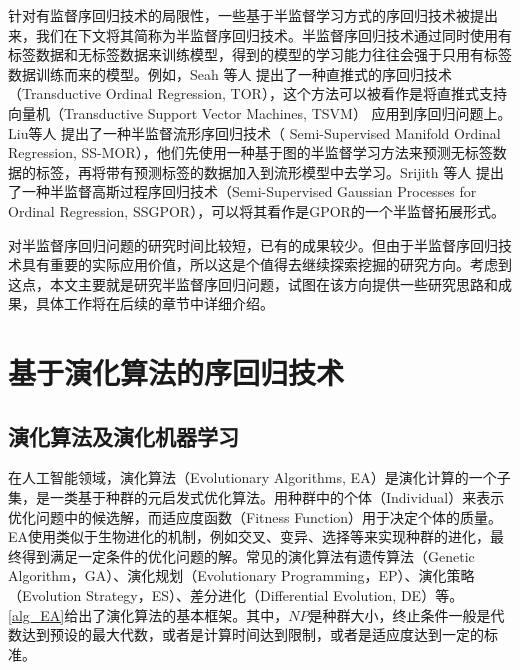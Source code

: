 针对有监督序回归技术的局限性，一些基于半监督学习方式的序回归技术被提出来，我们在下文将其简称为半监督序回归技术。半监督序回归技术通过同时使用有标签数据和无标签数据来训练模型，得到的模型的学习能力往往会强于只用有标签数据训练而来的模型。例如，Seah 等人\citep{seah2012transductive}
提出了一种直推式的序回归技术（Transductive Ordinal Regression, TOR），这个方法可以被看作是将直推式支持向量机（Transductive Support Vector Machines, TSVM\citep{joachims1999transductive}）
应用到序回归问题上。Liu等人\citep{liu2011semi}
提出了一种半监督流形序回归技术（ Semi-Supervised Manifold Ordinal Regression, SS-MOR），他们先使用一种基于图的半监督学习方法来预测无标签数据的标签，再将带有预测标签的数据加入到流形模型中去学习。Srijith 等人\citep{srijith2013semi}
提出了一种半监督高斯过程序回归技术（Semi-Supervised Gaussian Processes for Ordinal Regression, SSGPOR），可以将其看作是GPOR\citep{chu2005gaussian}的一个半监督拓展形式。

对半监督序回归问题的研究时间比较短，已有的成果较少。但由于半监督序回归技术具有重要的实际应用价值，所以这是个值得去继续探索挖掘的研究方向。考虑到这点，本文主要就是研究半监督序回归问题，试图在该方向提供一些研究思路和成果，具体工作将在后续的章节中详细介绍。 

\section{基于演化算法的序回归技术}

\subsection{演化算法及演化机器学习}

在人工智能领域，演化算法（Evolutionary Algorithms, EA）\citep{back1996evolutionary}是演化计算的一个子集，是一类基于种群的元启发式优化算法。用种群中的个体（Individual）来表示优化问题中的候选解，而适应度函数（Fitness Function）用于决定个体的质量。EA使用类似于生物进化的机制，例如交叉、变异、选择等来实现种群的进化，最终得到满足一定条件的优化问题的解。常见的演化算法有遗传算法（Genetic Algorithm，GA）、演化规划（Evolutionary Programming，EP）、演化策略（Evolution Strategy，ES）、差分进化（Differential Evolution, DE）等。\autoref{alg_EA}给出了演化算法的基本框架。其中，\(NP\)是种群大小，终止条件一般是代数达到预设的最大代数，或者是计算时间达到限制，或者是适应度达到一定的标准。

